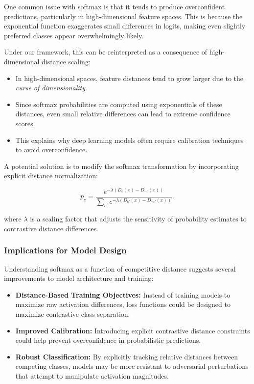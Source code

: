 One common issue with softmax is that it tends to produce overconfident predictions, particularly in high-dimensional feature spaces. This is because the exponential function exaggerates small differences in logits, making even slightly preferred classes appear overwhelmingly likely.

Under our framework, this can be reinterpreted as a consequence of high-dimensional distance scaling:

\begin{itemize}
    \item In high-dimensional spaces, feature distances tend to grow larger due to the \textit{curse of dimensionality}.
    \item Since softmax probabilities are computed using exponentials of these distances, even small relative differences can lead to extreme confidence scores.
    \item This explains why deep learning models often require calibration techniques to avoid overconfidence.
\end{itemize}

A potential solution is to modify the softmax transformation by incorporating explicit distance normalization:

\[
p_c = \frac{e^{-\lambda (D_c(x) - D_{\neg c}(x))}}{\sum_{c'} e^{-\lambda (D_{c'}(x) - D_{\neg c'}(x))}}.
\]

where \( \lambda \) is a scaling factor that adjusts the sensitivity of probability estimates to contrastive distance differences.

\subsubsection{Implications for Model Design}

Understanding softmax as a function of competitive distance suggests several improvements to model architecture and training:

\begin{itemize}
    \item \textbf{Distance-Based Training Objectives:} Instead of training models to maximize raw activation differences, loss functions could be designed to maximize contrastive class separation.
    \item \textbf{Improved Calibration:} Introducing explicit contrastive distance constraints could help prevent overconfidence in probabilistic predictions.
    \item \textbf{Robust Classification:} By explicitly tracking relative distances between competing classes, models may be more resistant to adversarial perturbations that attempt to manipulate activation magnitudes.
\end{itemize}

